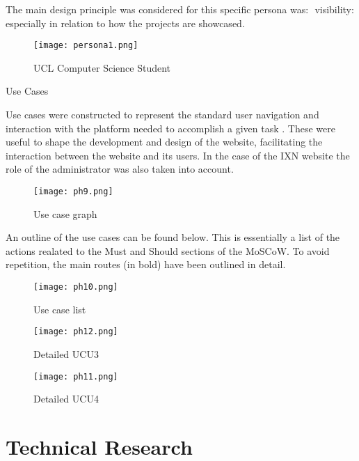 The main design principle was considered for this specific persona was:
​ visibility: especially in relation to how the projects are showcased.
​

\begin{figure}[H]
      \centering
      \texttt{[image: persona1.png]}
      \caption{UCL Computer Science Student}
\end{figure}

Use Cases

Use cases were constructed to represent the standard user navigation and
interaction with the platform needed to accomplish a given task
\cite{g3}. These were useful to shape the development and design of the
website, facilitating the interaction between the website and its users.
In the case of the IXN website the role of the administrator was also
taken into account.

\begin{figure}[H]
      \centering
      \texttt{[image: ph9.png]}
      \caption{Use case graph}
\end{figure}

An outline of the use cases can be found below. This is essentially a
list of the actions realated to the Must and Should sections of the
MoSCoW. To avoid repetition, the main routes (in bold) have been
outlined in detail.

\begin{figure}[H]
      \centering
      \texttt{[image: ph10.png]}
      \caption{Use case list}
 \end{figure}

\begin{figure}[H]
      \centering
      \texttt{[image: ph12.png]}
      \caption{Detailed UCU3}
 \end{figure}

\begin{figure}[H]
      \centering
      \texttt{[image: ph11.png]}
      \caption{Detailed UCU4}
 \end{figure}

\hypertarget{technical-research}{%
\section{Technical Research}\label{technical-research}}


